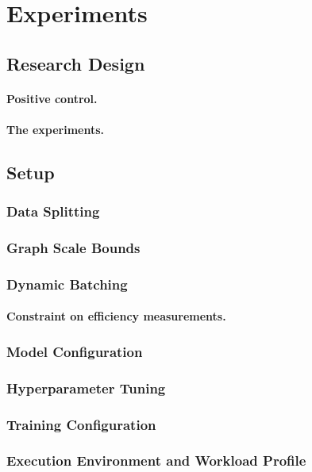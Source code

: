 \section{Experiments}
\label{sec:method:experiment}

\subsection{Research Design}
\label{sec:method:experiment:design}

\paragraph{Positive control.}

\paragraph{The experiments.}
\label{sec:method:experiment:phases}

\subsection{Setup}
\label{sec:method:experiment:setup}

\subsubsection{Data Splitting}
\label{sec:method:experiment:splitting}

\subsubsection{Graph Scale Bounds}
\label{sec:method:experiment:scale}

\subsubsection{Dynamic Batching}
\label{sec:method:experiment:batching}

\paragraph{Constraint on efficiency measurements.}

\subsubsection{Model Configuration}
\label{sec:method:experiment:model}

\subsubsection{Hyperparameter Tuning}
\label{sec:method:experiment:hp}

\subsubsection{Training Configuration}
\label{sec:method:experiment:training}

\subsubsection{Execution Environment and Workload Profile}
\label{sec:method:experiment:hardware}
